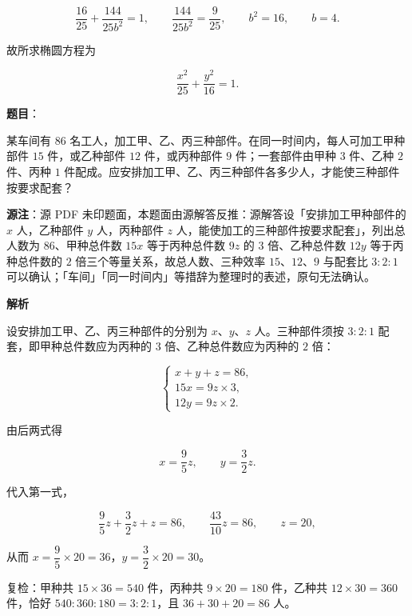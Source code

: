 \begin{answer}
\nopagebreak[4]
\[
\frac{16}{25}+\frac{144}{25b^2}=1,
\qquad
\frac{144}{25b^2}=\frac{9}{25},
\qquad
b^2=16,
\qquad
b=4.
\]

故所求椭圆方程为

\nopagebreak[4]
\[
\frac{x^2}{25}+\frac{y^2}{16}=1.
\]







\end{answer}
\begin{answer}

\textbf{题目}：

某车间有 $86$ 名工人，加工甲、乙、丙三种部件。在同一时间内，每人可加工甲种部件 $15$ 件，或乙种部件 $12$ 件，或丙种部件 $9$ 件；一套部件由甲种 $3$ 件、乙种 $2$ 件、丙种 $1$ 件配成。应安排加工甲、乙、丙三种部件各多少人，才能使三种部件按要求配套？

\begin{gktip}
\textbf{源注}：源 PDF 未印题面，本题面由源解答反推：源解答设「安排加工甲种部件的 $x$ 人，乙种部件 $y$ 人，丙种部件 $z$ 人，能使加工的三种部件按要求配套」，列出总人数为 $86$、甲种总件数 $15x$ 等于丙种总件数 $9z$ 的 $3$ 倍、乙种总件数 $12y$ 等于丙种总件数的 $2$ 倍三个等量关系，故总人数、三种效率 $15$、$12$、$9$ 与配套比 $3:2:1$ 可以确认；「车间」「同一时间内」等措辞为整理时的表述，原句无法确认。
\end{gktip}

\textbf{解析}

设安排加工甲、乙、丙三种部件的分别为 $x$、$y$、$z$ 人。三种部件须按 $3:2:1$ 配套，即甲种总件数应为丙种的 $3$ 倍、乙种总件数应为丙种的 $2$ 倍：

\nopagebreak[4]
\[
\begin{cases}
x+y+z=86,\\
15x=9z\times3,\\
12y=9z\times2.
\end{cases}
\]

由后两式得

\nopagebreak[4]
\[
x=\frac95z,
\qquad
y=\frac32z.
\]

代入第一式，

\nopagebreak[4]
\[
\frac95z+\frac32z+z=86,
\qquad
\frac{43}{10}z=86,
\qquad
z=20,
\]

从而 $x=\dfrac95\times20=36$，$y=\dfrac32\times20=30$。

复检：甲种共 $15\times36=540$ 件，丙种共 $9\times20=180$ 件，乙种共 $12\times30=360$ 件，恰好 $540:360:180=3:2:1$，且 $36+30+20=86$ 人。


\end{answer}
